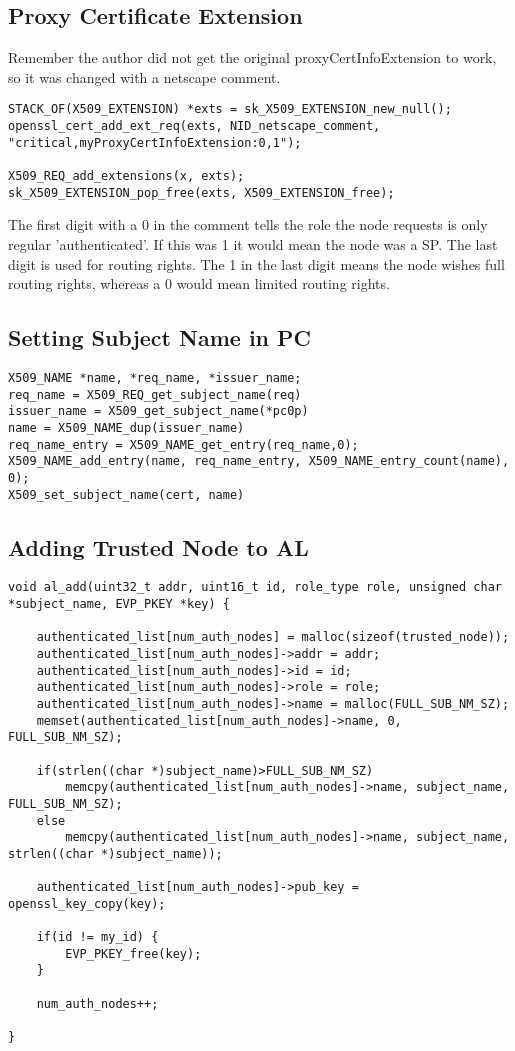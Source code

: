 \subsection{Proxy Certificate Extension}\label{code:pc_ext}
Remember the author did not get the original proxyCertInfoExtension to work, so
it was changed with a netscape comment.

\begin{lstlisting}[frame=tb]
STACK_OF(X509_EXTENSION) *exts = sk_X509_EXTENSION_new_null();
openssl_cert_add_ext_req(exts, NID_netscape_comment, "critical,myProxyCertInfoExtension:0,1");

X509_REQ_add_extensions(x, exts);
sk_X509_EXTENSION_pop_free(exts, X509_EXTENSION_free);
\end{lstlisting}

The first digit with a 0 in the comment tells the role the node requests is only
regular 'authenticated'. If this was  1 it would mean the node was a SP. The
last digit is used for routing rights. The 1 in the last digit means the node
wishes full routing rights, whereas a 0 would mean limited routing rights.

\subsection{Setting Subject Name in PC}\label{code:set_subject_name}
\begin{lstlisting}[frame=tb]
X509_NAME *name, *req_name, *issuer_name;
req_name = X509_REQ_get_subject_name(req)
issuer_name = X509_get_subject_name(*pc0p)
name = X509_NAME_dup(issuer_name)
req_name_entry = X509_NAME_get_entry(req_name,0);
X509_NAME_add_entry(name, req_name_entry, X509_NAME_entry_count(name), 0);
X509_set_subject_name(cert, name)
\end{lstlisting}

\subsection{Adding Trusted Node to AL}\label{code:add_to_al}
\begin{lstlisting}[frame=tb]
void al_add(uint32_t addr, uint16_t id, role_type role, unsigned char *subject_name, EVP_PKEY *key) {

	authenticated_list[num_auth_nodes] = malloc(sizeof(trusted_node));
	authenticated_list[num_auth_nodes]->addr = addr;
	authenticated_list[num_auth_nodes]->id = id;
	authenticated_list[num_auth_nodes]->role = role;
	authenticated_list[num_auth_nodes]->name = malloc(FULL_SUB_NM_SZ);
	memset(authenticated_list[num_auth_nodes]->name, 0, FULL_SUB_NM_SZ);

	if(strlen((char *)subject_name)>FULL_SUB_NM_SZ)
		memcpy(authenticated_list[num_auth_nodes]->name, subject_name, FULL_SUB_NM_SZ);
	else
		memcpy(authenticated_list[num_auth_nodes]->name, subject_name, strlen((char *)subject_name));

	authenticated_list[num_auth_nodes]->pub_key = openssl_key_copy(key);

	if(id != my_id) {
		EVP_PKEY_free(key);
	}

	num_auth_nodes++;

}
\end{lstlisting}

